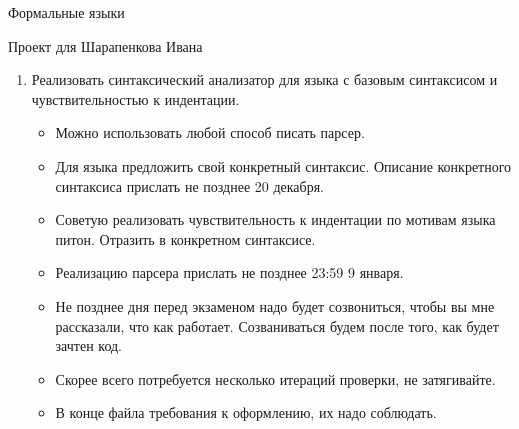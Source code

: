 \documentclass[12pt]{article}
\begin{document}
\begin{center}
{\LARGE Формальные языки}

{\Large Проект для Шарапенкова Ивана}

\end{center}

\bigskip

\begin{enumerate}
  \item {Реализовать синтаксический анализатор для языка с базовым синтаксисом и чувствительностью к индентации. }
  \begin{itemize}
    \item Можно использовать любой способ писать парсер.
    \item Для языка предложить свой конкретный синтаксис. Описание конкретного синтаксиса прислать не позднее 20 декабря.
    \item Советую реализовать чувствительность к индентации по мотивам языка питон. Отразить в конкретном синтаксисе.
    \item Реализацию парсера прислать не позднее 23:59 9 января.
    \item Не позднее дня перед экзаменом надо будет созвониться, чтобы вы мне рассказали, что как работает. Созваниваться будем после того, как будет зачтен код.
    \item Скорее всего потребуется несколько итераций проверки, не затягивайте.
    \item В конце файла требования к оформлению, их надо соблюдать.
  \end{itemize}

\end{enumerate}



\bigskip


\end{document}
